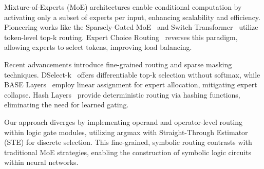Mixture-of-Experts (MoE) architectures enable conditional computation by activating only a subset of experts per input, enhancing scalability and efficiency. Pioneering works like the Sparsely-Gated MoE~\cite{shazeer2017outrageously} and Switch Transformer~\cite{fedus2022switch} utilize token-level top-k routing. Expert Choice Routing~\cite{zhou2022mixture} reverses this paradigm, allowing experts to select tokens, improving load balancing.

Recent advancements introduce fine-grained routing and sparse masking techniques. DSelect-k~\cite{hazimeh2021dselect} offers differentiable top-k selection without softmax, while BASE Layers~\cite{lewis2021base} employ linear assignment for expert allocation, mitigating expert collapse. Hash Layers~\cite{roller2021hash} provide deterministic routing via hashing functions, eliminating the need for learned gating.

Our approach diverges by implementing operand and operator-level routing within logic gate modules, utilizing argmax with Straight-Through Estimator (STE) for discrete selection. This fine-grained, symbolic routing contrasts with traditional MoE strategies, enabling the construction of symbolic logic circuits within neural networks.

